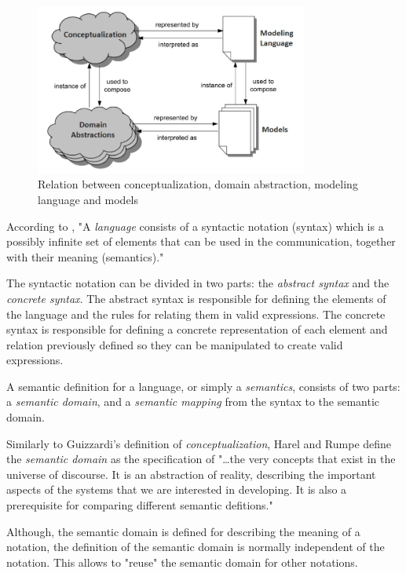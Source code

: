 \documentclass[
  10pt,				%
  oneside,
  a4paper,			%
  brazilian,
  english
]{abntex2}
\begin{document}
\begin{figure}[here]
\includegraphics[width=0.8\textwidth]{images/materializing_concepts}
\caption{Relation between conceptualization, domain abstraction, modeling language and
models}
\label{fig:materializing_concepts}
\end{figure}

According to ,
"A \emph{language} consists of a syntactic notation (syntax) which is a possibly
infinite set of elements that can be used in the communication, together with
their meaning (semantics)."

The syntactic notation can be divided in two parts: the \emph{abstract syntax}
and the \emph{concrete syntax}.
%
The abstract syntax is responsible for defining the elements of the language and
the rules for relating them in valid expressions.
%
The concrete syntax is responsible for defining a concrete representation of each
element and relation previously defined so they can be manipulated to create valid
expressions. \cite{harel_rumpe00}

A semantic definition for a language, or simply a \emph{semantics}, consists of
two parts: a \emph{semantic domain}, and a \emph{semantic mapping} from the syntax
to the semantic domain.

Similarly to Guizzardi's definition of \emph{conceptualization}, Harel and Rumpe
define the \emph{semantic domain} as the specification of "\ldots the very concepts
that exist in the universe of discourse. It is an abstraction of reality, describing
the important aspects of the systems that we are interested in developing. It is
also a prerequisite for comparing different semantic defitions."

Although, the semantic domain is defined for describing the meaning of a notation,
the definition of the semantic domain is normally independent of the notation.
This allows to "reuse" the semantic domain for other notations. \cite{harel_rumpe00}
\end{document}
